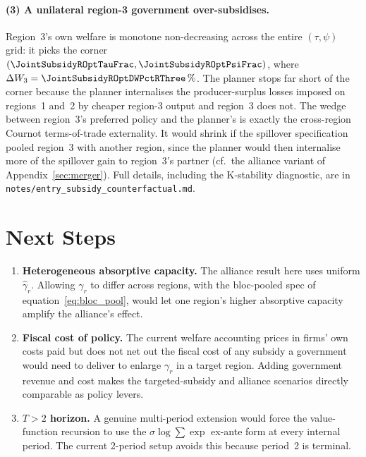 \documentclass[12pt]{article}
\begin{document}
\paragraph{(3) A unilateral region-3 government over-subsidises.}
Region~3's own welfare is monotone non-decreasing across the entire
$(\tau, \psi)$ grid: it picks the corner
$(\JointSubsidyROptTauFrac, \JointSubsidyROptPsiFrac)$, where
$\Delta W_3 = \JointSubsidyROptDWPctRThree\,\%$. The planner stops far
short of the corner because the planner internalises the
producer-surplus losses imposed on regions~1 and~2 by cheaper
region-3 output and region~3 does not. The wedge between region~3's
preferred policy and the planner's is exactly the cross-region
Cournot terms-of-trade externality. It would shrink if the spillover
specification pooled region~3 with another region, since the planner
would then internalise more of the spillover gain to region~3's
partner (cf.\ the alliance variant of Appendix~\ref{sec:merger}).
Full details, including the K-stability diagnostic, are in
\texttt{notes/entry\_subsidy\_counterfactual.md}.

\section{Next Steps}

\begin{enumerate}
  \item \textbf{Heterogeneous absorptive capacity.} The alliance result
        here uses uniform $\widehat{\gamma}_r$. Allowing $\gamma_r$ to
        differ across regions, with the bloc-pooled spec of
        equation~\eqref{eq:bloc_pool}, would let one region's higher
        absorptive capacity amplify the alliance's effect.
  \item \textbf{Fiscal cost of policy.} The current welfare accounting
        prices in firms' own costs paid but does not net out the fiscal
        cost of any subsidy a government would need to deliver to enlarge
        $\gamma_r$ in a target region. Adding government revenue and cost
        makes the targeted-subsidy and alliance scenarios directly
        comparable as policy levers.
  \item \textbf{$T > 2$ horizon.} A genuine multi-period extension would
        force the value-function recursion to use the
        $\sigma \log \sum \exp$ ex-ante form at every internal period.
        The current 2-period setup avoids this because period~2 is
        terminal.
\end{enumerate}
\end{document}
